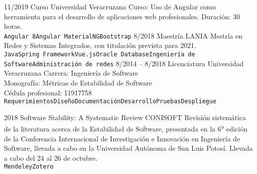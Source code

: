 \documentclass[9pt]{developercv} %
\begin{document}

\begin{entrylist}
	\entry
		{11/2019}
		{Curso}
		{Universidad Veracruzana}
        {Curso: Uso de Angular como herramienta para el desarrollo de aplicaciones web profesionales. Duración: 30 horas.\\
        \texttt{Angular 8}\slashsep\texttt{Angular Material}\slashsep\texttt{NGBootstrap}}
	\entry
		{8/2018}
		{Maestría}
		{LANIA}
        {Mestría en Redes y Sistemas Integrados, con titulación prevista para 2021.\\
        \texttt{Java}\slashsep\texttt{Spring Framework}\slashsep\texttt{Vue.js}\slashsep\texttt{Oracle Database}\slashsep\texttt{Ingeniería de Software}\slashsep\texttt{Administración de redes}}
	\entry
		{8/2014 -- 8/2018}
		{Licenciatura}
		{Universidad Veracruzana}
        {Carrera: Ingeniería de Software\\
        Monografía: Métricas de Estabilidad de Software\\
        Cédula profesional: 11917758\\
        \texttt{Requerimientos}\slashsep\texttt{Diseño}\slashsep\texttt{Documentación}\slashsep\texttt{Desarrollo}\slashsep\texttt{Pruebas}\slashsep\texttt{Despliegue}}
\end{entrylist}



\begin{entrylist}
	\entry
		{2018}
		{Software Stability: A Systematic Review}
		{CONISOFT}
        {Revisión sistemática de la literatura acerca de la Estabilidad de Software, presentada en la 6\textsuperscript{a} edición de la Conferencia Internacional de Investigación e Innovación en Ingeniería de Software, llevada a cabo en la Universidad Autónoma de San Luis Potosí. Llevada a cabo del 24 al 26 de octubre.\\
        \texttt{Mendeley}\slashsep\texttt{Zotero}}
\end{entrylist}



\end{document}
